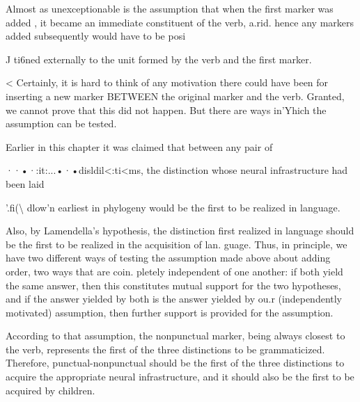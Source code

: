 Almost as unexceptionable is the assumption that when the first marker was added , it became an immediate constituent of the verb, a.rid. hence any markers added subsequently would have to be posi{\textquotedbl}

J ti6ned externally to the unit formed by the verb and the first marker.

{\textless} Certainly, it is hard to think of any motivation there could have been for inserting a new marker BETWEEN the original marker and the verb. Granted, we cannot prove that this did not happen. But there are ways in'Yhich the assumption can be tested.

Earlier in this chapter it was claimed that between any pair of

··•·:it:...•·•disldil{\textless}:ti{\textless}ms, the distinction whose neural infrastructure had been laid

'.fi({\textbackslash} dlow'n earliest in phylogeny would be the first to be realized in language.


Also, by Lamendella's hypothesis, the distinction first realized in language should be the first to be realized in the acquisition of lan. guage. Thus, in principle, we have two different ways of testing the assumption made above about adding order, two ways that are coin. pletely independent of one another: if both yield the same answer, then this constitutes mutual support for the two hypotheses, and if the answer yielded by both is the answer yielded by ou.r (indepen\-dently motivated) assumption, then further support is provided for the assumption.

According to that assumption, the nonpunctual marker, being always closest to the verb, represents the first of the three distinctions to be grammaticized. Therefore, punctual-nonpunctual should be the first of the three distinctions to acquire the appropriate neural infra\-structure, and it should also be the first to be acquired by children.

